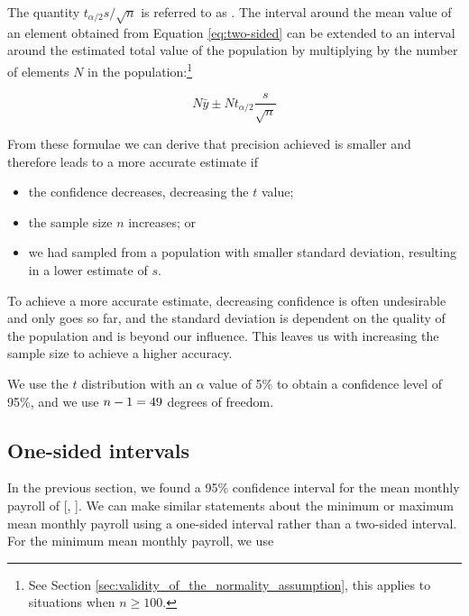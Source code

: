 The quantity $t_{\alpha/2} {s}/{\sqrt{n}}$ is referred to as . The interval around the mean value of an element obtained from Equation \ref{eq:two-sided} can be extended to an interval around the estimated total value of the population by multiplying by the number of elements $N$ in the population:\footnote{See Section \ref{sec:validity_of_the_normality_assumption}, this applies to situations when $n \geq 100$.
}

\begin{equation}
N \bar{y} \pm N t_{\alpha/2} \frac{s}{\sqrt{n}}
\label{eq:two-sided_pop}
\end{equation}

From these formulae we can derive that precision achieved is smaller and therefore leads to a more accurate estimate if

\begin{itemize}
\item the confidence decreases, decreasing the $t$ value;
\item the sample size $n$ increases; or
\item we had sampled from a population with smaller standard deviation, resulting in a lower estimate of $s$.
\end{itemize}

To achieve a more accurate estimate, decreasing confidence is often undesirable and only goes so far, and the standard deviation is dependent on the quality of the population and is beyond our influence. This leaves us with increasing the sample size to achieve a higher accuracy.

\bigskip
We use the $t$ distribution with an $\alpha$ value of 5\% to obtain a confidence level of 95\%, and we use $n - 1 = \EstMeanDf$ degrees of freedom. 



\bigskip




\subsection{One-sided intervals} %
\label{sub:one_sided_intervals}

In the previous section, we found a 95\% confidence interval for the mean monthly payroll of [,\hspace{0.5em} ]. We can make similar statements about the minimum or maximum mean monthly payroll using a one-sided interval rather than a two-sided interval. For the minimum mean monthly payroll, we use

